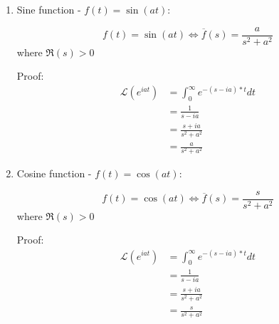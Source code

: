\documentclass[10pt,a4paper]{article}
\begin{document}
\begin{enumerate}
     \item Sine function - $f(t)=\sin(at)$:
     \begin{tcolorbox}[breakable,colback=white,colframe=black,width=\dimexpr\textwidth+12mm\relax,enlarge left by=-6mm]
        \begin{equation*} 
            f(t)=\sin (at) \Leftrightarrow \overline{f}(s)=\frac{a}{s^2+a^2} 
        \end{equation*}
        where $\Re (s)>0$
     \end{tcolorbox}
     Proof: 
     \begin{equation*} 
        \begin{aligned}
            \mathcal{L}(e^{iat})&=\int_{0}^{\infty}e^{-(s-ia)*t} dt \\
            &= \frac{1}{s-ia} \\
            &= \frac{s+ia}{s^2+a^2} \\ 
            &= \frac{a}{s^2+a^2}
        \end{aligned}
     \end{equation*}

     \item Cosine function - $f(t)=\cos(at)$:
     \begin{tcolorbox}[breakable,colback=white,colframe=black,width=\dimexpr\textwidth+12mm\relax,enlarge left by=-6mm]
        \begin{equation*} 
            f(t)=\cos (at) \Leftrightarrow \overline{f}(s)=\frac{s}{s^2+a^2} 
        \end{equation*}
        where $\Re (s)>0$
     \end{tcolorbox}
     Proof: 
     \begin{equation*} 
        \begin{aligned}
            \mathcal{L}(e^{iat})&=\int_{0}^{\infty}e^{-(s-ia)*t} dt \\
            &= \frac{1}{s-ia} \\
            &= \frac{s+ia}{s^2+a^2} \\
            &= \frac{s}{s^2+a^2}
        \end{aligned}
     \end{equation*}
     \pagebreak


\end{enumerate}
\end{document}
